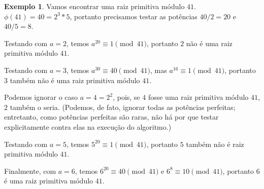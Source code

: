 \documentclass{article}
\theoremstyle{definition}
\newtheorem{example}{Exemplo}
\begin{document}
\begin{example}
    Vamos encontrar uma raiz primitiva módulo $41$.
    $\phi(41) = 40 = 2^3*5$,
    portanto precisamos testar as potências $40/2 = 20$ e $40/5 = 8$.

    Testando com $a = 2$, temos $a^{20} \equiv 1 \pmod{41}$,
    portanto $2$ não é uma raiz primitiva módulo $41$.

    Testando com $a = 3$, temos $a^{30} \equiv 40 \pmod{41}$,
    mas $a^{16} \equiv 1 \pmod{41}$,
    portanto $3$ também não é uma raiz primitiva módulo $41$.

    Podemos ignorar o caso $a = 4 = 2^2$,
    pois, se $4$ fosse uma raiz primitiva módulo $41$,
    $2$ também o seria.
    (Podemos, de fato, ignorar todas as potências perfeitas;
    entretanto,
    como potências perfeitas são raras,
    não há por que testar explicitamente contra elas na execução do algoritmo.)

    Testando com $a = 5$, temos $5^{20} \equiv 1 \pmod{41}$,
    portanto $5$ também não é raiz primitiva módulo $41$.

    Finalmente, com $a = 6$, temos $6^{20} \equiv 40 \pmod{41}$
    e $6^8 \equiv 10 \pmod{41}$,
    portanto $6$ é uma raiz primitiva módulo $41$.
\end{example}



\end{document}
